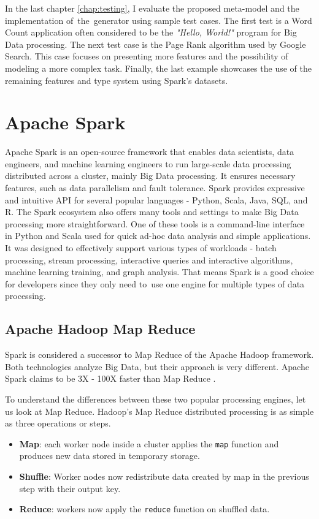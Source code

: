 In the last chapter \ref{chap:testing}, I evaluate the proposed meta-model and the implementation of~the~generator using sample test cases. The first test is a Word Count application often considered to be the \textit{"Hello, World!"} program for Big Data processing. The next test case is the Page Rank algorithm used by Google Search. This case focuses on presenting more features and the possibility of modeling a more complex task. Finally, the last example showcases the use of the remaining features and type system using Spark's datasets.


\chapter{Apache Spark}
\label{chap:spark}

Apache Spark is an open-source framework that enables data scientists, data engineers, and machine learning engineers to run large-scale data processing distributed across a cluster, mainly Big Data processing. It ensures necessary features, such as data parallelism and fault tolerance. Spark provides expressive and intuitive API for several popular languages - Python, Scala, Java, SQL, and R. The Spark ecosystem also offers many tools and settings to make Big Data processing more straightforward. One of these tools is a command-line interface in Python and Scala used for quick ad-hoc data analysis and simple applications. It was designed to effectively support various types of workloads - batch processing, stream processing, interactive queries and interactive algorithms, machine learning training, and graph analysis. That means Spark is a good choice for developers since they only need to~use one engine for multiple types of data processing.

\section{Apache Hadoop Map Reduce}

Spark is considered a successor to Map Reduce of the Apache Hadoop framework. Both technologies analyze Big Data, but their approach is very different. Apache Spark claims to be 3X - 100X faster than Map Reduce  \cite{HadoopSpark}.

To understand the differences between these two popular processing engines, let us look at Map Reduce. Hadoop's Map Reduce distributed processing is as simple as three operations or steps. 

\begin{itemize}
    \item \textbf{Map}: each worker node inside a cluster applies the \texttt{map} function and produces new data stored in temporary storage.
     \item \textbf{Shuffle}: Worker nodes now redistribute data created by map in the previous step with their output key.
     \item \textbf{Reduce}: workers now apply the \texttt{reduce} function on shuffled data.
     
\end{itemize}



